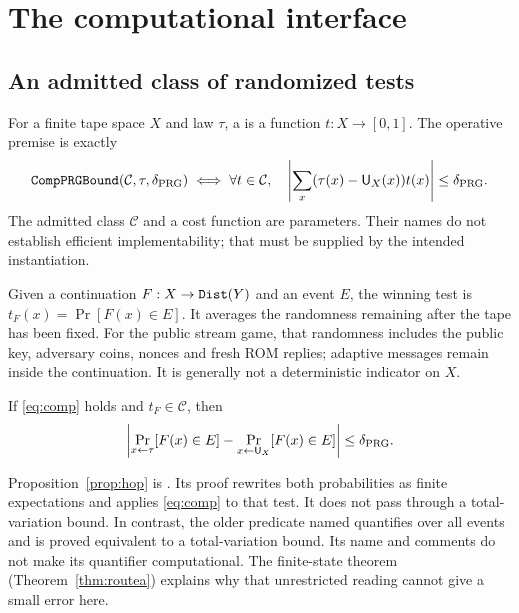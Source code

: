 \section{The computational interface}\label{sec:computational}
\subsection{An admitted class of randomized tests}
For a finite tape space $X$ and law $\tau$, a  is a
function $t:X\to[0,1]$. The operative premise is exactly
\begin{equation}\label{eq:comp}
 \code{CompPRGBound}(\mathcal C,\tau,\dprg)
 \iff\forall t\in\mathcal C,\quad
 \left|\sum_x(\tau(x)-\U_X(x))t(x)\right|\leq\dprg.
\end{equation}
The admitted class $\mathcal C$ and a cost function are parameters.
Their names do not establish efficient implementability; that must
be supplied by the intended instantiation.

Given a continuation $F:X\to\code{Dist}(Y)$ and an event $E$, the
winning test is $t_F(x)=\Pr[F(x)\in E]$. It averages the randomness
remaining after the tape has been fixed. For the public stream game,
that randomness includes the public key, adversary coins, nonces and
fresh ROM replies; adaptive messages remain inside the continuation.
It is generally not a deterministic indicator on $X$.

\begin{proposition}\label{prop:hop}
If \eqref{eq:comp} holds and $t_F\in\mathcal C$, then
\[
 \left|\Pr_{x\leftarrow\tau}[F(x)\in E]
       -\Pr_{x\leftarrow\mathsf{U}_X}[F(x)\in E]\right|\leq\delta_{\mathrm{PRG}}.
\]
\end{proposition}
Proposition~\ref{prop:hop} is . Its proof rewrites both probabilities
as finite expectations and applies \eqref{eq:comp} to that test.
It does not pass through a total-variation bound. In contrast, the
older predicate named  quantifies over all
events and is proved equivalent to a total-variation bound. Its
name and comments do not make its quantifier computational.
The finite-state theorem (Theorem~\ref{thm:routea}) explains why
that unrestricted reading cannot give a small error here.

